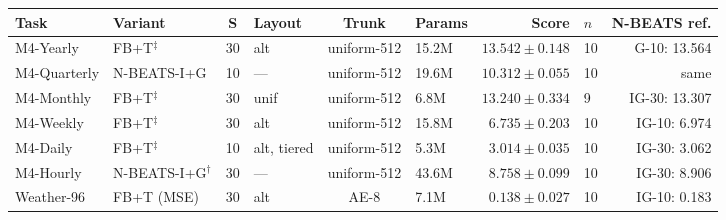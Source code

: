\begin{table}[t]
  \setlength{\tabcolsep}{2.3pt}
  \begin{tabular}{@{}llclclrlr@{}}
    \toprule
    Task & Variant & S & Layout & Trunk & Params & Score & $n$ & N-BEATS ref. \\
    \midrule
    M4-Yearly    & FB+T$^{\ddag}$        & 30 & alt & uniform-512 & 15.2M & $13.542 \pm 0.148$ & 10 & G-10: 13.564 \\
    M4-Quarterly & N-BEATS-I+G           & 10 & --- & uniform-512 & 19.6M & $10.312 \pm 0.055$ & 10 & same \\
    M4-Monthly   & FB+T$^{\ddag}$        & 30 & unif & uniform-512 & 6.8M  & $13.240 \pm 0.334$ & 9  & IG-30: 13.307 \\
    M4-Weekly    & FB+T$^{\ddag}$        & 30 & alt & uniform-512 & 15.8M & $\phantom{0}6.735 \pm 0.203$ & 10 & IG-10: 6.974 \\
    M4-Daily     & FB+T$^{\ddag}$        & 10 & alt, tiered & uniform-512 & 5.3M & $\phantom{0}3.014 \pm 0.035$ & 10 & IG-30: 3.062 \\
    M4-Hourly    & N-BEATS-I+G$^{\dag}$  & 30 & --- & uniform-512 & 43.6M & $\phantom{0}8.758 \pm 0.099$ & 10 & IG-30: 8.906 \\
    Weather-96   & FB+T (MSE)            & 30 & alt & AE-8        & 7.1M  & $\phantom{0}0.138 \pm 0.027$ & 10 & IG-10: 0.183 \\
    \bottomrule
  \end{tabular}
\end{table}